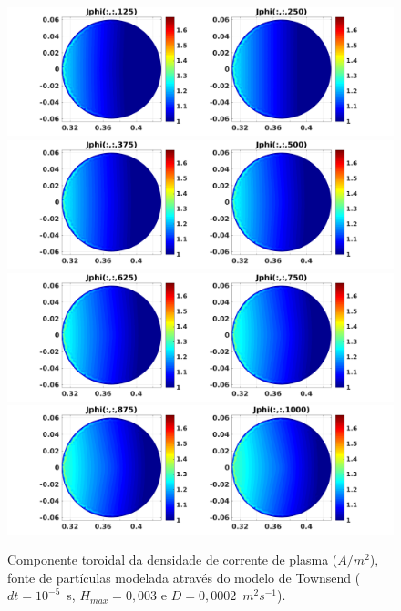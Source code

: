 \documentclass[12pt,oneside,a4paper]{abntex2}
\begin{document}
\begin{figure}[H]
\centering
\includegraphics[scale=0.5]{../SImulacao_breakdown/PDE/Jphitod1B2.png}  
\includegraphics[scale=0.5]{../SImulacao_breakdown/PDE/Jphitod2B2.png} 
\includegraphics[scale=0.5]{../SImulacao_breakdown/PDE/Jphitod3B2.png} 
\includegraphics[scale=0.5]{../SImulacao_breakdown/PDE/Jphitod4B2.png} 
\caption{Componente toroidal da densidade de corrente de plasma ($A/m^2$), fonte de partículas modelada através do modelo de Townsend ($dt=10^{-5}$\ s, $H_{max} = 0,003$ e $D=0,0002$\ $m^2s^{-1}$).}
\label{resucoef2}
\end{figure}
\end{document}
